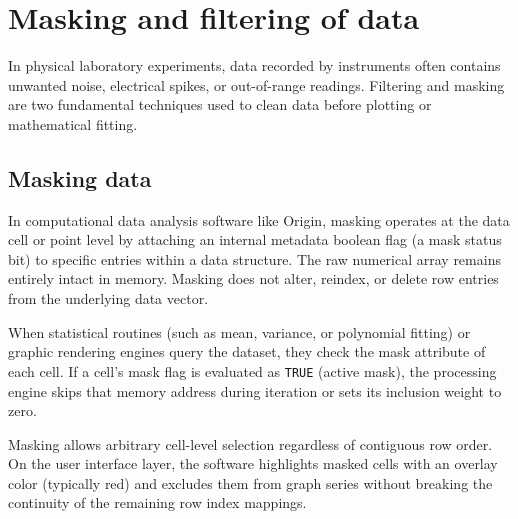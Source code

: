 \section{Masking and filtering of data}
	In physical laboratory experiments, data recorded by instruments often contains unwanted noise, electrical spikes, or out-of-range readings. Filtering and masking are two fundamental techniques used to clean data before plotting or mathematical fitting.
	
	\subsection{Masking data}
		In computational data analysis software like Origin, masking operates at the data cell or point level by attaching an internal metadata boolean flag (a mask status bit) to specific entries within a data structure. The raw numerical array remains entirely intact in memory. Masking does not alter, reindex, or delete row entries from the underlying data vector.
		
		When statistical routines (such as mean, variance, or polynomial fitting) or graphic rendering engines query the dataset, they check the mask attribute of each cell. If a cell's mask flag is evaluated as \verb|TRUE| (active mask), the processing engine skips that memory address during iteration or sets its inclusion weight to zero.
		
		Masking allows arbitrary cell-level selection regardless of contiguous row order. On the user interface layer, the software highlights masked cells with an overlay color (typically red) and excludes them from graph series without breaking the continuity of the remaining row index mappings.
		
